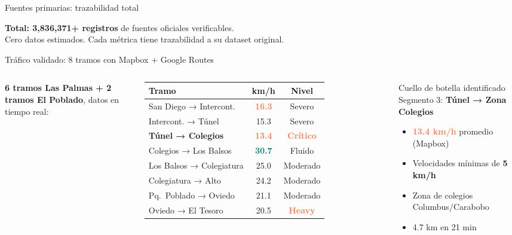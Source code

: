 \documentclass[aspectratio=169, 11pt]{beamer}
\newcommand{\highlight}[1]{\textcolor{teal}{\textbf{#1}}}
\newcommand{\danger}[1]{\textcolor{coral}{\textbf{#1}}}
\newcommand{\src}[1]{\par\vspace{2pt}{\tiny\textcolor{slate}{Fuente: #1}}}
\begin{document}
\begin{frame}{Fuentes primarias: trazabilidad total}
\vspace{6pt}
\begin{center}
{\small\textbf{Total: 3,836,371+ registros} de fuentes oficiales verificables.\\
Cero datos estimados. Cada métrica tiene trazabilidad a su dataset original.}
\end{center}
\end{frame}

\begin{frame}{Tráfico validado: 8 tramos con Mapbox + Google Routes}

\begin{columns}[T]
\textbf{6 tramos Las Palmas + 2 tramos El Poblado}, datos en tiempo real:

\vspace{6pt}
{\small
\begin{tabular}{@{}lcc@{}}
\toprule
\textbf{Tramo} & \textbf{km/h} & \textbf{Nivel} \\
\midrule
San Diego → Intercont. & \danger{16.3} & Severo \\
Intercont. → Túnel & 15.3 & Severo \\
\rowcolor{coral!12}
\textbf{Túnel → Colegios} & \danger{13.4} & \danger{Crítico} \\
Colegios → Los Balsos & \highlight{30.7} & Fluido \\
Los Balsos → Colegiatura & 25.0 & Moderado \\
Colegiatura → Alto & 24.2 & Moderado \\
\midrule
Pq.\ Poblado → Oviedo & 21.1 & Moderado \\
\rowcolor{coral!8}
Oviedo → El Tesoro & 20.5 & \danger{Heavy} \\
\bottomrule
\end{tabular}
}

\src{Mapbox Directions API + Google Routes API, marzo 2026}

\begin{alertblock}{\small Cuello de botella identificado}
\small Segmento 3: \textbf{Túnel → Zona Colegios}

\vspace{4pt}
\begin{itemize}\small
  \item \danger{13.4 km/h} promedio (Mapbox)
  \item Velocidades mínimas de \textbf{5 km/h}
  \item Zona de colegios Columbus/Carabobo
  \item 4.7 km en 21 min
\end{itemize}
\end{alertblock}


\end{columns}
\end{frame}
\end{document}
